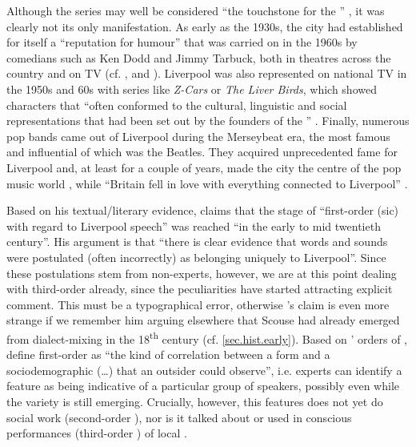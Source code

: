 Although the series may well be considered ``the touchstone for the '' \citep[79]{crowley2012}, it was clearly not its only manifestation.
As early as the 1930s, the city had established for itself a ``reputation for humour'' that was carried on in the 1960s by comedians such as Ken Dodd and Jimmy Tarbuck, both in theatres across the country and on TV (cf. \citealt[423]{murden2006}, and \citealp[49]{belchem2006a}).
Liverpool was also represented on national TV in the 1950s and 60s with series like \emph{Z-Cars} or \emph{The Liver Birds}, which showed characters that ``often conformed to the cultural, linguistic and social representations that had been set out by the founders of the '' \parencite[75]{crowley2012}.
Finally, numerous pop bands came out of Liverpool during the Merseybeat era, the most famous and influential of which was the Beatles.
They acquired unprecedented fame for Liverpool and, at least for a couple of years, made the city the centre of the pop music world \citep[cf.][75]{crowley2012}, while ``Britain fell in love with everything connected to Liverpool'' \citep[423]{murden2006}.

Based on his textual/literary evidence, \citet[107]{crowley2012} claims that the stage of ``first-order (sic)  with regard to Liverpool speech'' was reached ``in the early to mid twentieth century''.
His argument is that ``there is clear evidence that words and sounds were postulated (often incorrectly) as belonging uniquely to Liverpool''.
Since these postulations stem from non-experts, however, we are at this point dealing with third-order  already, since the peculiarities have started attracting explicit comment.
This must be a typographical error, otherwise \citeauthor{crowley2012}'s claim is even more strange if we remember him arguing elsewhere that Scouse had already emerged from dialect-mixing in the 18\textsuperscript{th} century (cf. \ref{sec.hist.early}).
Based on \citeauthor{silverstein2003}' \citeyear{silverstein2003} orders of , \textcite[81]{johnstoneetal2006} define first-order  as ``the kind of correlation between a form and a sociodemographic  (\ldots) that an outsider could observe'', i.e. experts can identify a feature as being indicative of a particular group of speakers, possibly even while the variety is still emerging.
Crucially, however, this features does not yet do social work (second-order ), nor is it talked about or used in conscious performances (third-order ) of local  \parencite[cf.][83--84]{johnstoneetal2006}.

